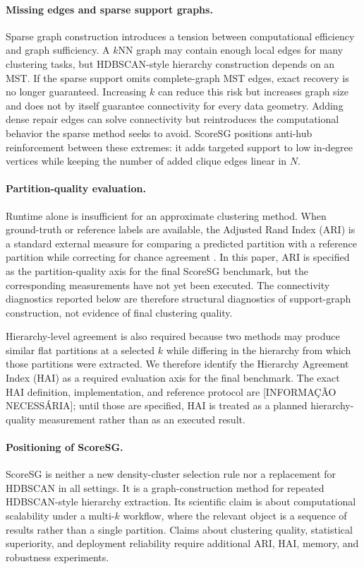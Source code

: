 \documentclass[11pt]{article}
\begin{document}
\paragraph{Missing edges and sparse support graphs.}
Sparse graph construction introduces a tension between computational efficiency and graph sufficiency. A \(k\)NN graph may contain enough local edges for many clustering tasks, but HDBSCAN-style hierarchy construction depends on an MST. If the sparse support omits complete-graph MST edges, exact recovery is no longer guaranteed. Increasing \(k\) can reduce this risk but increases graph size and does not by itself guarantee connectivity for every data geometry. Adding dense repair edges can solve connectivity but reintroduces the computational behavior the sparse method seeks to avoid. ScoreSG positions anti-hub reinforcement between these extremes: it adds targeted support to low in-degree vertices while keeping the number of added clique edges linear in \(N\).

\paragraph{Partition-quality evaluation.}
Runtime alone is insufficient for an approximate clustering method. When ground-truth or reference labels are available, the Adjusted Rand Index (ARI) is a standard external measure for comparing a predicted partition with a reference partition while correcting for chance agreement \citep{hubert1985comparing}. In this paper, ARI is specified as the partition-quality axis for the final ScoreSG benchmark, but the corresponding measurements have not yet been executed. The connectivity diagnostics reported below are therefore structural diagnostics of support-graph construction, not evidence of final clustering quality.

Hierarchy-level agreement is also required because two methods may produce similar flat partitions at a selected \(k\) while differing in the hierarchy from which those partitions were extracted. We therefore identify the Hierarchy Agreement Index (HAI) as a required evaluation axis for the final benchmark. The exact HAI definition, implementation, and reference protocol are [INFORMAÇÃO NECESSÁRIA]; until those are specified, HAI is treated as a planned hierarchy-quality measurement rather than as an executed result.

\paragraph{Positioning of ScoreSG.}
ScoreSG is neither a new density-cluster selection rule nor a replacement for HDBSCAN in all settings. It is a graph-construction method for repeated HDBSCAN-style hierarchy extraction. Its scientific claim is about computational scalability under a multi-\(k\) workflow, where the relevant object is a sequence of results rather than a single partition. Claims about clustering quality, statistical superiority, and deployment reliability require additional ARI, HAI, memory, and robustness experiments.
\end{document}
